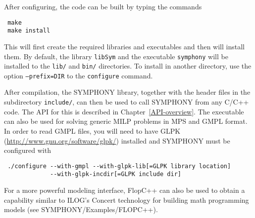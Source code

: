 After configuring, the code can be built by typing the commands
{\color{Brown}
\begin{verbatim}
 make
 make install
\end{verbatim}
} This will first create the required libraries and executables and then will
install them. By default, the library {\color{Brown}\texttt{libSym}} and the
executable {\color{Brown}\texttt{symphony}} will be installed to the
{\color{Brown}\texttt{lib/}} and {\color{Brown}\texttt{bin/}} directories. To
install in another directory, use the option
{\color{Brown}\texttt{--prefix=DIR}} to the {\color{Brown}\texttt{configure}}
command.

After compilation, the SYMPHONY library, together with the header files in the
subdirectory {\color{Brown}\texttt{include/}}, can then be used to call
SYMPHONY from any C/C++ code. The API for this is described in
Chapter~\ref{API-overview}. The executable can also be used for solving
generic MILP problems in MPS and GMPL format. In order to read GMPL files, you
will need to have GLPK (\url{http://www.gnu.org/software/glpk/}) installed and
SYMPHONY must be configured with {\color{Brown}
\begin{verbatim}
 ./configure --with-gmpl --with-glpk-lib[=GLPK library location] 
             --with-glpk-incdir[=GLPK include dir] 
\end{verbatim}
}
For a more powerful modeling interface, FlopC++ can also be used to obtain a
capability similar to ILOG's Concert technology for building math programming
models (see SYMPHONY/Examples/FLOPC++). 

